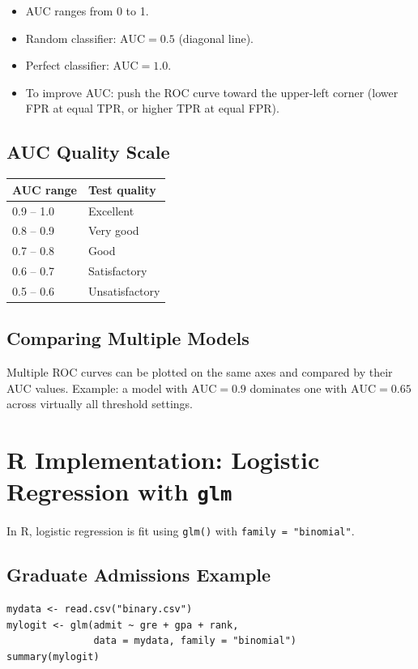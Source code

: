 \documentclass[11pt]{article}
\begin{document}
\begin{itemize}
    \item AUC ranges from 0 to 1.
    \item Random classifier: $\text{AUC} = 0.5$ (diagonal line).
    \item Perfect classifier: $\text{AUC} = 1.0$.
    \item To improve AUC: push the ROC curve toward the upper-left corner
      (lower FPR at equal TPR, or higher TPR at equal FPR).
\end{itemize}

\subsection{AUC Quality Scale}

\begin{center}
\begin{tabular}{@{}ll@{}}
\toprule
\textbf{AUC range} & \textbf{Test quality} \\
\midrule
0.9 -- 1.0 & Excellent \\
0.8 -- 0.9 & Very good \\
0.7 -- 0.8 & Good \\
0.6 -- 0.7 & Satisfactory \\
0.5 -- 0.6 & Unsatisfactory \\
\bottomrule
\end{tabular}
\end{center}

\subsection{Comparing Multiple Models}
Multiple ROC curves can be plotted on the same axes and compared by their
AUC values. Example: a model with $\text{AUC} = 0.9$ dominates one with
$\text{AUC} = 0.65$ across virtually all threshold settings.


\newpage
\section{R Implementation: Logistic Regression with \texttt{glm}}

In R, logistic regression is fit using \texttt{glm()} with
\texttt{family = "binomial"}.

\subsection{Graduate Admissions Example}
\begin{verbatim}
mydata <- read.csv("binary.csv")
mylogit <- glm(admit ~ gre + gpa + rank,
               data = mydata, family = "binomial")
summary(mylogit)
\end{verbatim}
\end{document}
